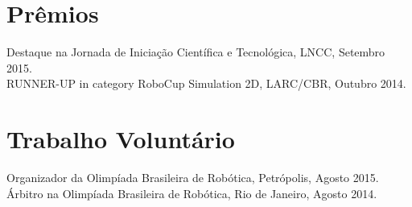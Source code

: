 \documentclass[margin, 10pt]{res} %
\begin{document}
\begin{resume}

\section{Prêmios} 
Destaque na Jornada de Iniciação Científica e Tecnológica, LNCC, Setembro 2015.\\
RUNNER-UP in category RoboCup Simulation 2D, LARC/CBR, Outubro 2014.


\section{Trabalho Voluntário}
Organizador da Olimpíada Brasileira de Robótica, Petrópolis, Agosto 2015.\\
Árbitro na Olimpíada Brasileira de Robótica, Rio de Janeiro, Agosto 2014.


\end{resume}
\end{document}
